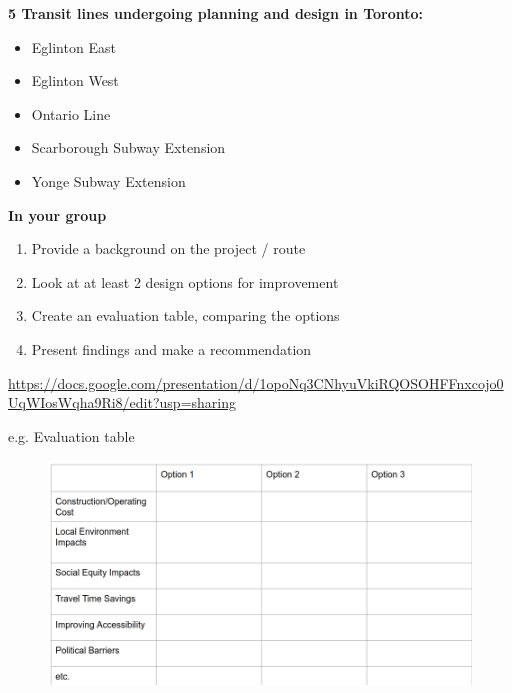 \documentclass[aspectratio=169]{beamer}
\begin{document}
\begin{frame}
	
	\textbf{5 Transit lines undergoing planning and design in Toronto:}
	
	\begin{itemize}
		\item Eglinton East
		\item Eglinton West
		\item Ontario Line
		\item Scarborough Subway Extension
		\item Yonge Subway Extension
	\end{itemize}
	
	\textbf{In your group}
	
	\begin{enumerate}
		\item Provide a background on the project / route
		\item Look at at least 2 design options for improvement
		\item Create an evaluation table, comparing the options
		\item Present findings and make a recommendation
	\end{enumerate}

	\url{https://docs.google.com/presentation/d/1opoNq3CNhyuVkiRQOSOHFFnxcojo0UqWIosWqha9Ri8/edit?usp=sharing}
	
\end{frame}



\begin{frame}
	
	e.g. Evaluation table
	
	\begin{figure}
		\centering
		\includegraphics[width=1\linewidth]{images/evaluation_table.png}
	\end{figure}
	
\end{frame}
\end{document}

